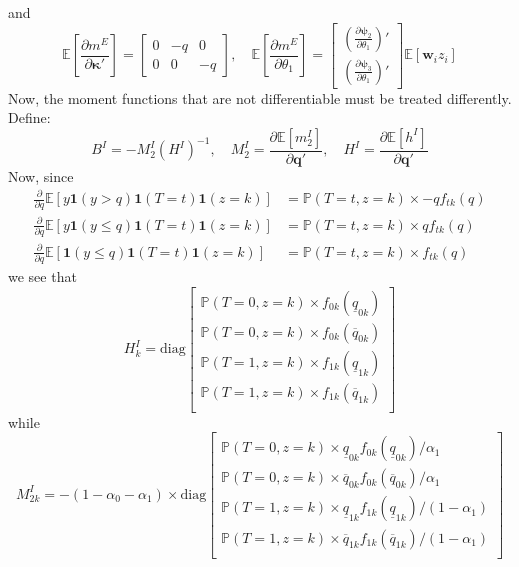 and
\[
\mathbb{E}\left[\frac{\partial m^E}{\partial \boldsymbol{\kappa}'}\right] = \left[
\begin{array}{ccc}
  0 & -q & 0 \\
  0 & 0 & -q
\end{array}
\right], \quad
\mathbb{E}\left[\frac{\partial m^E}{\partial \theta_1}\right] =
\left[
\begin{array}{c}
  \displaystyle\left( \frac{\partial \boldsymbol{\psi}_2}{\partial \theta_1} \right)'\\ 
  \displaystyle\left( \frac{\partial \boldsymbol{\psi}_3}{\partial \theta_1} \right)' 
\end{array}
\right] \mathbb{E}[\mathbf{w}_iz_i]
\]
Now, the moment functions that are not differentiable must be treated differently.
Define:
\[
  B^I = -{M}_2^I \left( H^I \right)^{-1}, \quad
  M_2^I = \frac{\partial\mathbb{E}[m_2^I]}{\partial \mathbf{q}'} , \quad
  H^I = \frac{\partial\mathbb{E}[h^I]}{\partial \mathbf{q}'} 
\]
Now, since
\begin{align*}
  \frac{\partial}{\partial q} \mathbb{E}\left[ y\mathbf{1}(y>q)\mathbf{1}(T=t)\mathbf{1}(z=k) \right] &= \mathbb{P}(T=t,z=k)\times -q f_{tk}(q)\\
  \frac{\partial}{\partial q} \mathbb{E}\left[ y\mathbf{1}(y\leq q)\mathbf{1}(T=t)\mathbf{1}(z=k) \right] &= \mathbb{P}(T=t, z=k) \times q f_{tk}(q)\\
  \frac{\partial}{\partial q} \mathbb{E}\left[ \mathbf{1}(y\leq q)\mathbf{1}(T=t)\mathbf{1}(z=k) \right] &= \mathbb{P}(T=t,z=k) \times f_{tk}(q)
\end{align*}
we see that
\[
  H^I_k = \mbox{diag} \left[
  \begin{array}{c}
    \mathbb{P}(T=0,z=k)\times f_{0k}(\underline{q}_{0k})\\
    \mathbb{P}(T=0,z=k)\times f_{0k}(\overline{q}_{0k})\\
    \mathbb{P}(T=1,z=k)\times f_{1k}(\underline{q}_{1k})\\
    \mathbb{P}(T=1,z=k)\times f_{1k}(\overline{q}_{1k})\\
  \end{array}
\right]
\]
while
\[
  M_{2k}^I = -(1 - \alpha_0 - \alpha_1)\times \mbox{diag} \left[
  \begin{array}{l}
    \mathbb{P}(T=0,z=k) \times \underline{q}_{0k} f_{0k}(\underline{q}_{0k}) / \alpha_1\\
    \mathbb{P}(T=0,z=k)\times \overline{q}_{0k} f_{0k}(\overline{q}_{0k}) / \alpha_1\\
    \mathbb{P}(T=1,z=k)\times \underline{q}_{1k} f_{1k}(\underline{q}_{1k}) / (1 - \alpha_1)\\
    \mathbb{P}(T=1,z=k)\times \overline{q}_{1k} f_{1k}(\overline{q}_{1k}) / (1 - \alpha_1)\\
  \end{array}
\right]
\]

